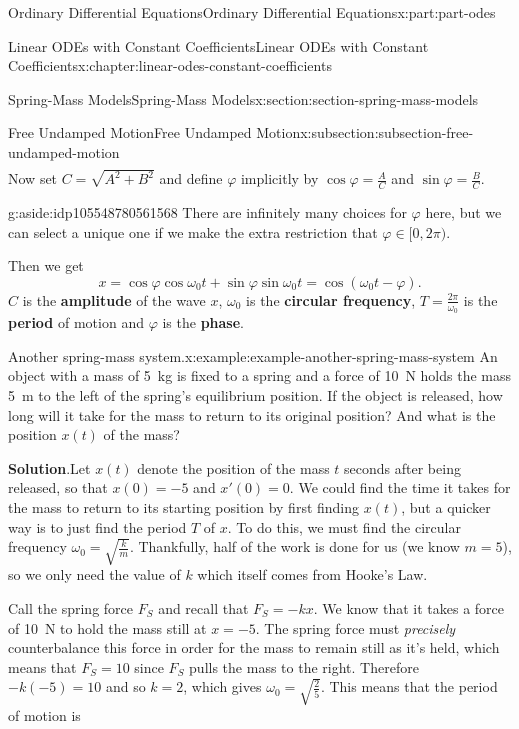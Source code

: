 \documentclass[oneside,10pt,]{book}
\newcommand{\blocktitlefont}{\relax}
\newcommand{\terminology}[1]{\textbf{#1}}
\numberwithin{equation}{part}
\begin{document}
\begin{partptx}{Ordinary Differential Equations}{}{Ordinary Differential Equations}{}{}{x:part:part-odes}
\begin{chapterptx}{Linear ODEs with Constant Coefficients}{}{Linear ODEs with Constant Coefficients}{}{}{x:chapter:linear-odes-constant-coefficients}
\begin{sectionptx}{Spring-Mass Models}{}{Spring-Mass Models}{}{}{x:section:section-spring-mass-models}
\begin{subsectionptx}{Free Undamped Motion}{}{Free Undamped Motion}{}{}{x:subsection:subsection-free-undamped-motion}
\begin{align*}
\end{align*}
Now set \(C = \sqrt{A^{2} + B^{2}}\) and define \(\varphi\) implicitly by \(\cos\varphi = \frac{A}{C}\) and \(\sin\varphi = \frac{B}{C}\). \begin{aside}{}{g:aside:idp105548780561568}%
There are infinitely many choices for \(\varphi\) here, but we can select a unique one if we make the extra restriction that \(\varphi\in[0,2\pi)\).%
\end{aside}
 Then we get%
\begin{equation*}
x = \cos\varphi\cos\omega_{0}t + \sin\varphi\sin\omega_{0}t = \cos(\omega_{0}t - \varphi).
\end{equation*}
\(C\) is the \terminology{amplitude} of the wave \(x\), \(\omega_{0}\) is the \terminology{circular frequency}, \(T = \frac{2\pi}{\omega_{0}}\) is the \terminology{period} of motion and \(\varphi\) is the \terminology{phase}.%
\begin{example}{Another spring-mass system.}{x:example:example-another-spring-mass-system}%
An object with a mass of \SI{5}{\kilo\gram} is fixed to a spring and a force of \SI{10}{\newton} holds the mass \SI{5}{\meter} to the left of the spring's equilibrium position. If the object is released, how long will it take for the mass to return to its original position? And what is the position \(x(t)\) of the mass?%
\par\smallskip%
\noindent\textbf{\blocktitlefont Solution}.\hypertarget{g:solution:idp105548780570400}{}\quad{}Let \(x(t)\) denote the position of the mass \(t\) seconds after being released, so that \(x(0) = -5\) and \(x'(0) = 0\). We could find the time it takes for the mass to return to its starting position by first finding \(x(t)\), but a quicker way is to just find the period \(T\) of \(x\). To do this, we must find the circular frequency \(\omega_{0} = \sqrt{\frac{k}{m}}\). Thankfully, half of the work is done for us (we know \(m=5\)), so we only need the value of \(k\) which itself comes from Hooke's Law.%
\par
Call the spring force \(F_{S}\) and recall that \(F_{S} = -kx\). We know that it takes a force of \SI{10}{\newton} to hold the mass still at \(x=-5\). The spring force must \emph{precisely} counterbalance this force in order for the mass to remain still as it's held, which means that \(F_{S} = 10\) since \(F_{S}\) pulls the mass to the right. Therefore \(-k(-5) = 10\) and so \(k=2\), which gives \(\omega_{0} = \sqrt{\frac{2}{5}}\). This means that the period of motion is%
\begin{equation*}

\end{equation*}
\end{example}
\end{subsectionptx}
\end{sectionptx}
\end{chapterptx}
\end{partptx}
\end{document}
